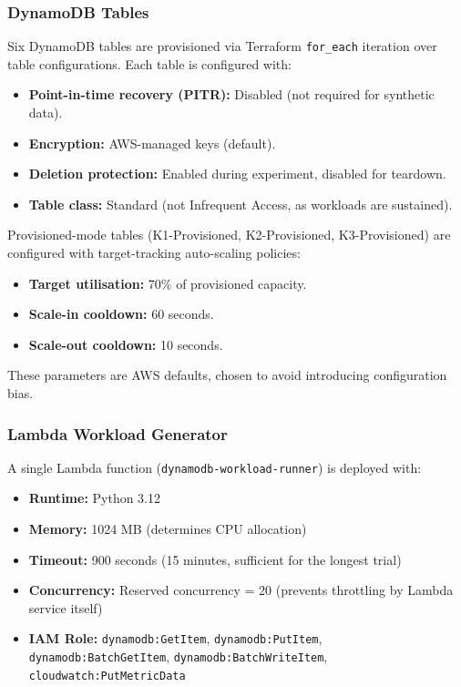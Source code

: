 \subsubsection{DynamoDB Tables}

Six DynamoDB tables are provisioned via Terraform \texttt{for\_each} iteration over table configurations. Each table is configured with:

\begin{itemize}
    \item \textbf{Point-in-time recovery (PITR):} Disabled (not required for synthetic data).
    \item \textbf{Encryption:} AWS-managed keys (default).
    \item \textbf{Deletion protection:} Enabled during experiment, disabled for teardown.
    \item \textbf{Table class:} Standard (not Infrequent Access, as workloads are sustained).
\end{itemize}

Provisioned-mode tables (K1-Provisioned, K2-Provisioned, K3-Provisioned) are configured with target-tracking auto-scaling policies:

\begin{itemize}
    \item \textbf{Target utilisation:} 70\% of provisioned capacity.
    \item \textbf{Scale-in cooldown:} 60 seconds.
    \item \textbf{Scale-out cooldown:} 10 seconds.
\end{itemize}

These parameters are AWS defaults, chosen to avoid introducing configuration bias.

\subsubsection{Lambda Workload Generator}

A single Lambda function (\texttt{dynamodb-workload-runner}) is deployed with:

\begin{itemize}
    \item \textbf{Runtime:} Python 3.12
    \item \textbf{Memory:} 1024 MB (determines CPU allocation)
    \item \textbf{Timeout:} 900 seconds (15 minutes, sufficient for the longest trial)
    \item \textbf{Concurrency:} Reserved concurrency = 20 (prevents throttling by Lambda service itself)
    \item \textbf{IAM Role:} \texttt{dynamodb:GetItem}, \texttt{dynamodb:PutItem}, \texttt{dynamodb:BatchGetItem}, \texttt{dynamodb:BatchWriteItem}, \texttt{cloudwatch:PutMetricData}
\end{itemize}

